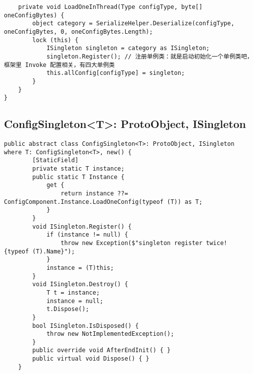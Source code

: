 \documentclass[9pt, b5paper]{article}
\begin{document}
\begin{verbatim}
    private void LoadOneInThread(Type configType, byte[] oneConfigBytes) {
        object category = SerializeHelper.Deserialize(configType, oneConfigBytes, 0, oneConfigBytes.Length);
        lock (this) {
            ISingleton singleton = category as ISingleton;
            singleton.Register(); // 注册单例类：就是启动初始化一个单例类吧，框架里 Invoke 配置相关，有四大单例类
            this.allConfig[configType] = singleton;
        }
    }
}
\end{verbatim}
\subsection{ConfigSingleton<T>: ProtoObject, ISingleton}
\label{sec-8-6}
\begin{verbatim}
public abstract class ConfigSingleton<T>: ProtoObject, ISingleton where T: ConfigSingleton<T>, new() {
        [StaticField]
        private static T instance;
        public static T Instance {
            get {
                return instance ??= ConfigComponent.Instance.LoadOneConfig(typeof (T)) as T;
            }
        }
        void ISingleton.Register() {
            if (instance != null) {
                throw new Exception($"singleton register twice! {typeof (T).Name}");
            }
            instance = (T)this;
        }
        void ISingleton.Destroy() {
            T t = instance;
            instance = null;
            t.Dispose();
        }
        bool ISingleton.IsDisposed() {
            throw new NotImplementedException();
        }
        public override void AfterEndInit() { }
        public virtual void Dispose() { }
    }
\end{verbatim}
\end{document}
